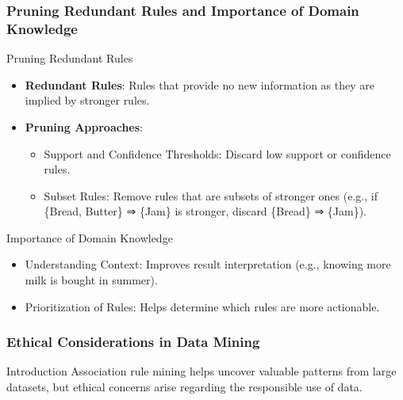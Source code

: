 \documentclass[aspectratio=169]{beamer}
\begin{document}
\begin{frame}[fragile]
    \frametitle{Pruning Redundant Rules and Importance of Domain Knowledge}
    \begin{block}{Pruning Redundant Rules}
        \begin{itemize}
            \item \textbf{Redundant Rules}: Rules that provide no new information as they are implied by stronger rules.
            \item \textbf{Pruning Approaches}:
            \begin{itemize}
                \item Support and Confidence Thresholds: Discard low support or confidence rules.
                \item Subset Rules: Remove rules that are subsets of stronger ones (e.g., if \{Bread, Butter\} ⇒ \{Jam\} is stronger, discard \{Bread\} ⇒ \{Jam\}).
            \end{itemize}
        \end{itemize}
    \end{block}
    
    \begin{block}{Importance of Domain Knowledge}
        \begin{itemize}
            \item Understanding Context: Improves result interpretation (e.g., knowing more milk is bought in summer).
            \item Prioritization of Rules: Helps determine which rules are more actionable.
        \end{itemize}
    \end{block}
\end{frame}

\begin{frame}[fragile]
    \frametitle{Ethical Considerations in Data Mining}
    \begin{block}{Introduction}
        Association rule mining helps uncover valuable patterns from large datasets, but ethical concerns arise regarding the responsible use of data.
    \end{block}
\end{frame}
\end{document}
